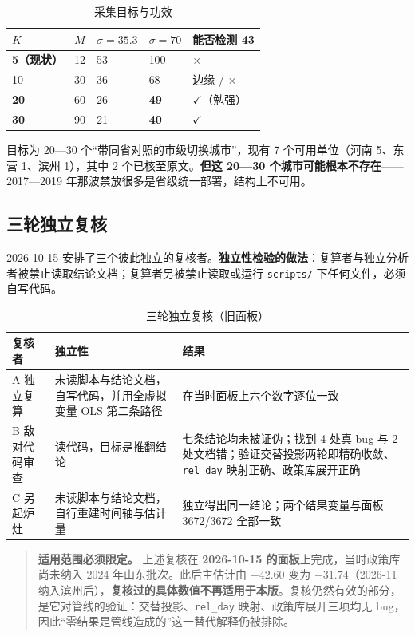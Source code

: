 \begin{table}[H]
\centering
\caption{采集目标与功效}
\label{tab:power}
\small
\begin{tabular}{R{1.3cm}R{1.3cm}R{2.8cm}R{2.6cm}L{3.6cm}}
\toprule
$K$ & $M$ & $\sigma=35.3$ & $\sigma=70$ & \textbf{能否检测 43} \\
\midrule
\textbf{5（现状）} & 12 & 53 & 100 & $\times$ \\
10 & 30 & 36 & 68 & 边缘 / $\times$ \\
\textbf{20} & 60 & 26 & \textbf{49} & $\checkmark$（勉强） \\
\textbf{30} & 90 & 21 & \textbf{40} & $\checkmark$ \\
\bottomrule
\end{tabular}
\end{table}

目标为 20—30 个“带同省对照的市级切换城市”，现有 7 个可用单位（河南 5、东营 1、滨州 1），其中 2 个已核至原文。\textbf{但这 20—30 个城市可能根本不存在}——2017—2019 年那波禁放很多是省级统一部署，结构上不可用。

\subsection{三轮独立复核}\label{app:replication}

2026-10-15 安排了三个彼此独立的复核者。\textbf{独立性检验的做法}：复算者与独立分析者被禁止读取结论文档；复算者另被禁止读取或运行 \texttt{scripts/} 下任何文件，必须自写代码。

\begin{table}[H]
\centering
\caption{三轮独立复核（旧面板）}
\label{tab:replication-a}
\small
\begin{tabular}{L{1.8cm}L{3.6cm}L{9.2cm}}
\toprule
\textbf{复核者} & \textbf{独立性} & \textbf{结果} \\
\midrule
A 独立复算 & 未读脚本与结论文档，自写代码，并用全虚拟变量 OLS 第二条路径 & 在当时面板上六个数字逐位一致 \\
B 敌对代码审查 & 读代码，目标是推翻结论 & 七条结论均未被证伪；找到 4 处真 bug 与 2 处文档错；验证交替投影两轮即精确收敛、\texttt{rel\_day} 映射正确、政策库展开正确 \\
C 另起炉灶 & 未读脚本与结论文档，自行重建时间轴与估计量 & 独立得出同一结论；两个结果变量与面板 3672/3672 全部一致 \\
\bottomrule
\end{tabular}
\end{table}

\begin{quote}
\textbf{适用范围必须限定。} 上述复核在 \textbf{2026-10-15 的面板}上完成，当时政策库尚未纳入 2024 年山东批次。此后主估计由 $-42.60$ 变为 $-31.74$（2026-11 纳入滨州后），\textbf{复核过的具体数值不再适用于本版}。复核仍然有效的部分，是它对管线的验证：交替投影、\texttt{rel\_day} 映射、政策库展开三项均无 bug，因此“零结果是管线造成的”这一替代解释仍被排除。
\end{quote}

